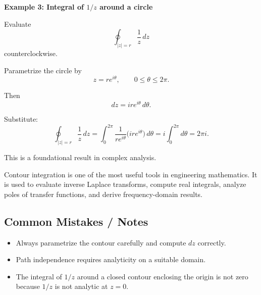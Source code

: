 \begin{examplebox}
    \textbf{Example 3: Integral of $1/z$ around a circle}

    Evaluate
    \[
        \oint_{|z|=r}\frac{1}{z}\,dz
    \]
    counterclockwise.

    Parametrize the circle by
    \[
        z=re^{i\theta}, \qquad 0\le \theta\le 2\pi.
    \]

    Then
    \[
        dz=ire^{i\theta}\,d\theta.
    \]

    Substitute:
    \[
        \oint_{|z|=r}\frac{1}{z}\,dz
        =
        \int_0^{2\pi}\frac{1}{re^{i\theta}}\big(ire^{i\theta}\big)\,d\theta
        =
        i\int_0^{2\pi} d\theta
        =
        2\pi i.
    \]

    This is a foundational result in complex analysis.
\end{examplebox}

\begin{noteBox}
    Contour integration is one of the most useful tools in engineering mathematics. It is used to evaluate inverse Laplace transforms, compute real integrals, analyze poles of transfer functions, and derive frequency-domain results.
\end{noteBox}

\subsection*{Common Mistakes / Notes}

\begin{itemize}
    \item Always parametrize the contour carefully and compute $dz$ correctly.
    \item Path independence requires analyticity on a suitable domain.
    \item The integral of $1/z$ around a closed contour enclosing the origin is not zero because $1/z$ is not analytic at $z=0$.
\end{itemize}